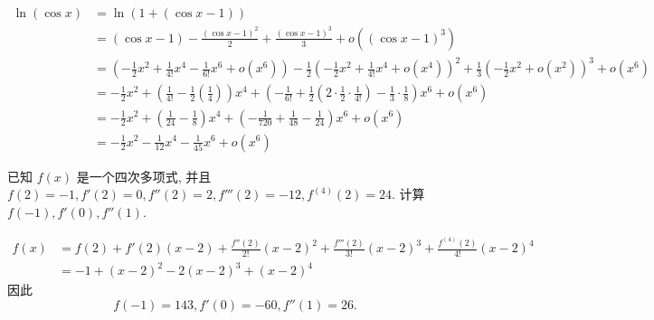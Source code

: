\begin{solution}
    \begin{align*}
        \ln(\cos x) & = \ln(1 + (\cos x - 1))                                                                                                                                                                                                          \\
                    & = (\cos x - 1) - \frac{(\cos x - 1)^2}{2} + \frac{(\cos x - 1)^3}{3} + o((\cos x - 1)^3)                                                                                                                                         \\
                    & = \left(-\frac{1}{2}x^2 + \frac{1}{4!}x^4 - \frac{1}{6!}x^6 + o(x^6)\right) - \frac{1}{2}\left(-\frac{1}{2}x^2 + \frac{1}{4!}x^4 + o(x^4)\right)^2 + \frac{1}{3}\left(-\frac{1}{2}x^2 + o(x^2)\right)^3 + o(x^6)                 \\
                    & = -\frac{1}{2}x^2 + \left(\frac{1}{4!} - \frac{1}{2}\left(\frac{1}{4}\right)\right)x^4 + \left(-\frac{1}{6!} + \frac{1}{2}\left(2 \cdot \frac{1}{2} \cdot \frac{1}{4!}\right) - \frac{1}{3} \cdot \frac{1}{8}\right)x^6 + o(x^6) \\
                    & = -\frac{1}{2}x^2 + \left(\frac{1}{24} - \frac{1}{8}\right)x^4 + \left(-\frac{1}{720} + \frac{1}{48} - \frac{1}{24}\right)x^6 + o(x^6)                                                                                           \\
                    & = -\frac{1}{2}x^2 - \frac{1}{12}x^4 - \frac{1}{45}x^6 + o(x^6)
    \end{align*}
\end{solution}

\begin{exercise}[3.6.4]
    已知 $f(x)$ 是一个四次多项式, 并且 $f(2) = -1, f'(2) = 0, f''(2) = 2, f'''(2) = -12, f^{(4)}(2) = 24$. 计算 $f(-1), f'(0), f''(1)$.
\end{exercise}

\begin{solution}
    \begin{align*}
        f(x) & = f(2) + f'(2)(x - 2) + \frac{f''(2)}{2!}(x - 2)^2 + \frac{f'''(2)}{3!}(x - 2)^3 + \frac{f^{(4)}(2)}{4!}(x - 2)^4 \\
             & = -1 + (x - 2)^2 - 2(x - 2)^3 + (x - 2)^4
    \end{align*}
    因此$$f(-1) = 143, f'(0) = -60, f''(1) = 26.$$
\end{solution}

